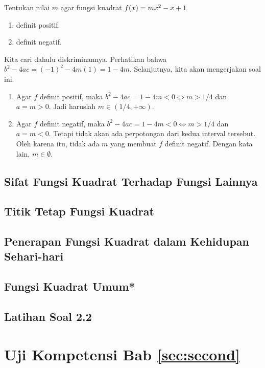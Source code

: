 	\begin{contoh}
		Tentukan nilai $ m $ agar fungsi kuadrat $ \mathop{}\!{f}{\left({x}\right)} = mx^{2} - x + 1 $
		\begin{enumerate}
			\item definit positif.
			\item definit negatif.
		\end{enumerate}
	\end{contoh}
	\begin{jawab}
		Kita cari dahulu diskriminannya. Perhatikan bahwa $ b^{2} - 4ac = \left(-1\right)^{2} - 4m\left(1\right) = 1 - 4m $. Selanjutnya, kita akan mengerjakan soal ini.
		\begin{enumerate}
			\item Agar $ f $ definit positif, maka $ b^{2} - 4ac = 1 - 4m < 0 \iff m > 1/4 $ dan $ a = m > 0 $. Jadi haruslah $ m \in \left(1/4, +\infty\right) $.
			\item Agar $ f $ definit negatif, maka $ b^{2} - 4ac = 1 - 4m < 0 \iff m > 1/4 $ dan $ a = m < 0 $. Tetapi tidak akan ada perpotongan dari kedua interval tersebut. Oleh karena itu, tidak ada $ m $ yang membuat $ f $ definit negatif. Dengan kata lain, $ m \in \emptyset $.
		\end{enumerate}
	\end{jawab}
	
\subsection{Sifat Fungsi Kuadrat Terhadap Fungsi Lainnya}
	
	\kant[9-10]
	
\subsection{Titik Tetap Fungsi Kuadrat}
	
	\kant[11-12]
	
\subsection{Penerapan Fungsi Kuadrat dalam Kehidupan Sehari-hari}
	
	\kant[13-14]
	
\subsection{Fungsi Kuadrat Umum*}
	
	\kant[15-16]
	
\subsection{Latihan Soal 2.2}
	
	\kant[17-18]

\newpage


\section{Uji Kompetensi Bab \ref{sec:second}}

\kant[6-10]